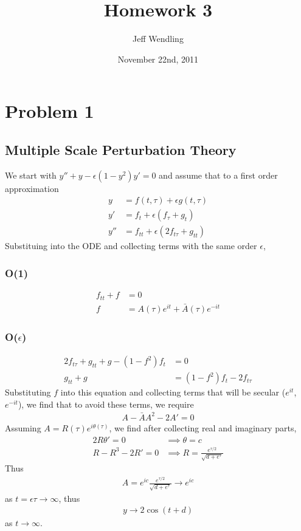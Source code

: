 \documentclass[12pt]{article}
\title{Homework 3}
\author{Jeff Wendling}
\date{November 22nd, 2011}
\newcommand{\eq}[1]{\begin{align*}#1\end{align*}}
\begin{document}
\maketitle
\section*{Problem 1}
\subsection*{Multiple Scale Perturbation Theory} We start with $y'' + y - \epsilon(1 - y^2)y' = 0$ and assume that to a first order approximation
\eq{
	y &= f(t,\tau) + \epsilon g(t,\tau)\\
	y' &= f_t + \epsilon(f_\tau + g_t)\\
	y'' &= f_{tt} + \epsilon(2f_{t\tau} + g_{tt})
}
Substituing into the ODE and collecting terms with the same order $\epsilon$,
\subsubsection*{O(1)}
\eq{
	f_{tt} + f &= 0\\
	f &= A(\tau)e^{it} + \bar{A}(\tau)e^{-it}
}
\subsubsection*{O($\epsilon$)}
\eq{
	2f_{t\tau} + g_{tt} + g - (1-f^2)f_t &= 0\\
	g_{tt} + g &= (1-f^2)f_t - 2f_{t\tau}
}
Substituting $f$ into this equation and collecting terms that will be secular ($e^{it}$, $e^{-it}$), we find that to avoid these terms, we require
\eq{
	A - \bar{A}A^2 - 2A' = 0
}
Assuming $A = R(\tau)e^{i\theta(\tau)}$, we find after collecting real and imaginary parts,
\eq{
	2R\theta' = 0 &\implies \theta = c\\
	R - R^3 - 2R' = 0 &\implies R = \frac{e^{\tau/2}}{\sqrt{d + e^\tau}}
}
Thus
\eq{
	A = e^{ic}\frac{e^{\tau / 2}}{\sqrt{d + e^\tau}} \rightarrow e^{ic}
}
as $t = \epsilon\tau \rightarrow \infty$, thus
\eq{
	y \rightarrow 2\cos(t+d)
}
as $t \rightarrow \infty$.
\end{document}
